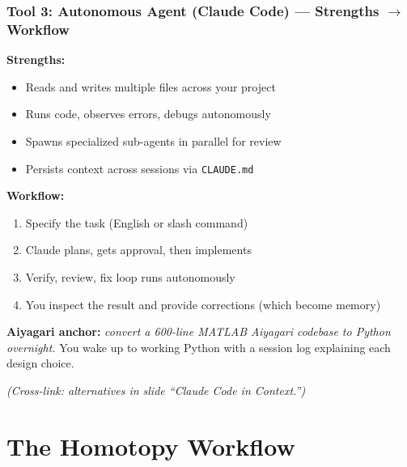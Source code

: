 \documentclass[10pt,english,aspectratio=169]{beamer}
\begin{document}
\begin{frame}
\frametitle{Tool 3: Autonomous Agent (Claude Code) --- Strengths $\to$ Workflow}

\textbf{Strengths:}
\begin{itemize}
    \item Reads and writes multiple files across your project
    \item Runs code, observes errors, debugs autonomously
    \item Spawns specialized sub-agents in parallel for review
    \item Persists context across sessions via \texttt{CLAUDE.md}
\end{itemize}

\vspace{0.2cm}

\textbf{Workflow:}
\begin{enumerate}
    \item Specify the task (English or slash command)
    \item Claude plans, gets approval, then implements
    \item Verify, review, fix loop runs autonomously
    \item You inspect the result and provide corrections (which become memory)
\end{enumerate}

\vspace{0.2cm}

\textbf{Aiyagari anchor:} \textit{convert a 600-line MATLAB Aiyagari codebase to Python overnight.} You wake up to working Python with a session log explaining each design choice.

\vspace{0.05cm}

\textit{(Cross-link: alternatives in slide ``Claude Code in Context.'')}
\end{frame}

\section{The Homotopy Workflow}
\end{document}
